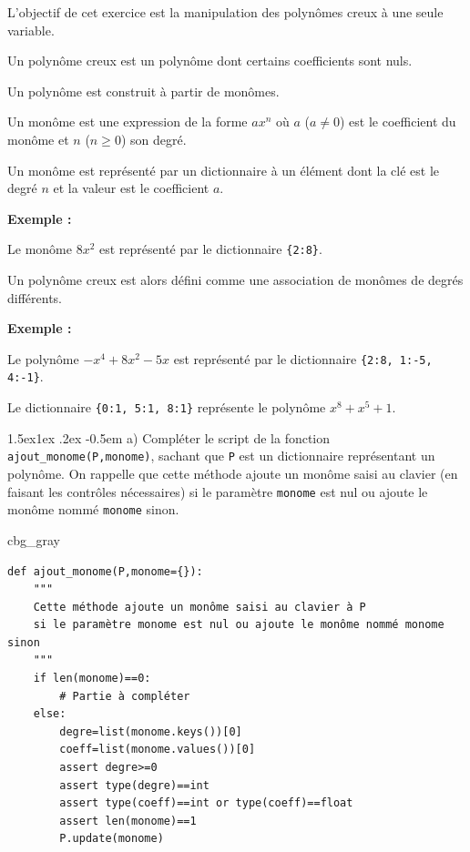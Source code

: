 \documentclass[%
oneside,                 %
final,                   %
10pt,french]{article}
\makeatletter
\newenvironment{_cod_tight}[1]{
   \def\FrameCommand{\colorbox{#1}}
   \FrameRule0.6pt\MakeFramed {\FrameRestore}\vskip3mm}
   {\vskip0mm\endMakeFramed}
\newenvironment{cod}[1]{
\bgroup\rmfamily
\fboxsep=0mm\relax
\begin{_cod_tight}{#1}
\list{}{\parsep=-2mm\parskip=0mm\topsep=0pt\leftmargin=2mm
\rightmargin=2\leftmargin\leftmargin=4pt\relax}
\item\relax}
{\endlist\end{_cod_tight}\egroup}
\newenvironment{doconceexercise}{}{}
\newcounter{doconceexercisecounter}
\newcommand\subex{\@startsection{paragraph}{4}{\z@}%
                  {1.5ex\@plus1ex \@minus.2ex}%
                  {-0.5em}%
                  {\normalfont\normalsize\bfseries}}
\makeatother
\begin{document}
\begin{doconceexercise}



L'objectif de cet exercice est la manipulation des polynômes creux à une seule variable.

Un polynôme creux est un polynôme dont certains coefficients sont nuls.

Un polynôme est construit à partir de monômes.

Un monôme est une expression de la forme $a x^n$ où $a$ ($a \neq 0$) est le coefficient du monôme et $n$ ($n \ge 0$) son degré.

Un monôme est représenté par un dictionnaire à un élément dont la clé est le degré $n$ et la valeur est le coefficient $a$.

\textbf{Exemple :}

Le monôme $8 x^2$ est représenté par le dictionnaire \Verb!{2:8}!.

Un polynôme creux est alors défini comme une association de monômes de degrés différents.

\textbf{Exemple :}

Le polynôme $-x^4 + 8 x^2 - 5 x$ est représenté par le dictionnaire \Verb!{2:8, 1:-5, 4:-1}!.

Le dictionnaire \Verb!{0:1, 5:1, 8:1}! représente le polynôme $x^8 + x^5 + 1$.


\subex{a)}
Compléter le script de la fonction \Verb!ajout_monome(P,monome)!, sachant que \texttt{P} est un dictionnaire représentant un polynôme. On rappelle que cette méthode ajoute un monôme saisi au clavier (en faisant les contrôles nécessaires) si le paramètre \texttt{monome} est nul ou ajoute le monôme nommé \texttt{monome} sinon.

\begin{cod}{cbg_gray}\begin{verbatim}
def ajout_monome(P,monome={}):
    """
    Cette méthode ajoute un monôme saisi au clavier à P
    si le paramètre monome est nul ou ajoute le monôme nommé monome sinon
    """
    if len(monome)==0:
        # Partie à compléter
    else:
        degre=list(monome.keys())[0]
        coeff=list(monome.values())[0]
        assert degre>=0
        assert type(degre)==int
        assert type(coeff)==int or type(coeff)==float
        assert len(monome)==1
        P.update(monome)
\end{verbatim}
\end{cod}
\noindent


\end{doconceexercise}
\end{document}
